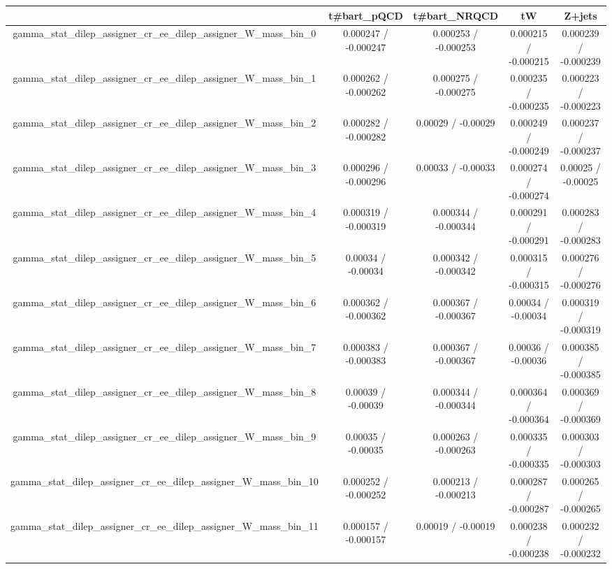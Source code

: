 \documentclass[10pt]{article}
\begin{document}
\begin{table}[htbp]
\begin{center}
\begin{tabular}{|c|c|c|c|c|}
\hline 
      & t#bar{t}_{pQCD}      & t#bar{t}_{NRQCD}      & tW      & Z+jets \\ 
\hline 
  gamma_stat_dilep_assigner_cr_ee_dilep_assigner_W_mass_bin_0 & 0.000247 / -0.000247 & 0.000253 / -0.000253 & 0.000215 / -0.000215 & 0.000239 / -0.000239 \\ 
  gamma_stat_dilep_assigner_cr_ee_dilep_assigner_W_mass_bin_1 & 0.000262 / -0.000262 & 0.000275 / -0.000275 & 0.000235 / -0.000235 & 0.000223 / -0.000223 \\ 
  gamma_stat_dilep_assigner_cr_ee_dilep_assigner_W_mass_bin_2 & 0.000282 / -0.000282 & 0.00029 / -0.00029 & 0.000249 / -0.000249 & 0.000237 / -0.000237 \\ 
  gamma_stat_dilep_assigner_cr_ee_dilep_assigner_W_mass_bin_3 & 0.000296 / -0.000296 & 0.00033 / -0.00033 & 0.000274 / -0.000274 & 0.00025 / -0.00025 \\ 
  gamma_stat_dilep_assigner_cr_ee_dilep_assigner_W_mass_bin_4 & 0.000319 / -0.000319 & 0.000344 / -0.000344 & 0.000291 / -0.000291 & 0.000283 / -0.000283 \\ 
  gamma_stat_dilep_assigner_cr_ee_dilep_assigner_W_mass_bin_5 & 0.00034 / -0.00034 & 0.000342 / -0.000342 & 0.000315 / -0.000315 & 0.000276 / -0.000276 \\ 
  gamma_stat_dilep_assigner_cr_ee_dilep_assigner_W_mass_bin_6 & 0.000362 / -0.000362 & 0.000367 / -0.000367 & 0.00034 / -0.00034 & 0.000319 / -0.000319 \\ 
  gamma_stat_dilep_assigner_cr_ee_dilep_assigner_W_mass_bin_7 & 0.000383 / -0.000383 & 0.000367 / -0.000367 & 0.00036 / -0.00036 & 0.000385 / -0.000385 \\ 
  gamma_stat_dilep_assigner_cr_ee_dilep_assigner_W_mass_bin_8 & 0.00039 / -0.00039 & 0.000344 / -0.000344 & 0.000364 / -0.000364 & 0.000369 / -0.000369 \\ 
  gamma_stat_dilep_assigner_cr_ee_dilep_assigner_W_mass_bin_9 & 0.00035 / -0.00035 & 0.000263 / -0.000263 & 0.000335 / -0.000335 & 0.000303 / -0.000303 \\ 
  gamma_stat_dilep_assigner_cr_ee_dilep_assigner_W_mass_bin_10 & 0.000252 / -0.000252 & 0.000213 / -0.000213 & 0.000287 / -0.000287 & 0.000265 / -0.000265 \\ 
  gamma_stat_dilep_assigner_cr_ee_dilep_assigner_W_mass_bin_11 & 0.000157 / -0.000157 & 0.00019 / -0.00019 & 0.000238 / -0.000238 & 0.000232 / -0.000232 \\ 

\end{tabular}
\end{center}
\end{table}
\end{document}
